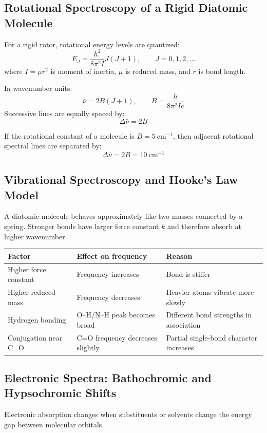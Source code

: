 \documentclass[12pt,a4paper]{article}
\begin{document}
\subsection{Rotational Spectroscopy of a Rigid Diatomic Molecule}
For a rigid rotor, rotational energy levels are quantized:
\[
E_J=\frac{h^2}{8\pi^2I}J(J+1),\qquad J=0,1,2,\ldots
\]
where $I=\mu r^2$ is moment of inertia, $\mu$ is reduced mass, and $r$ is bond length.

\begin{tcolorbox}[formulabox, title={Rotational Spectral Lines}]
In wavenumber units:
\[
\bar{\nu}=2B(J+1),\qquad B=\frac{h}{8\pi^2Ic}
\]
Successive lines are equally spaced by:
\[
\Delta\bar{\nu}=2B
\]
\end{tcolorbox}

\begin{tcolorbox}[examplebox, title={Solved Example: Rotational Line Spacing}]
If the rotational constant of a molecule is $B=5\ \mathrm{cm^{-1}}$, then adjacent rotational spectral lines are separated by:
\[
\Delta\bar{\nu}=2B=10\ \mathrm{cm^{-1}}
\]
\end{tcolorbox}

\subsection{Vibrational Spectroscopy and Hooke's Law Model}
A diatomic molecule behaves approximately like two masses connected by a spring. Stronger bonds have larger force constant $k$ and therefore absorb at higher wavenumber.

\begin{tabularx}{\linewidth}{|B{3.2cm}|Y|Y|}
\hline
\textbf{Factor} & \textbf{Effect on frequency} & \textbf{Reason} \\
\hline
Higher force constant & Frequency increases & Bond is stiffer \\
\hline
Higher reduced mass & Frequency decreases & Heavier atoms vibrate more slowly \\
\hline
Hydrogen bonding & O--H/N--H peak becomes broad & Different bond strengths in association \\
\hline
Conjugation near C=O & C=O frequency decreases slightly & Partial single-bond character increases \\
\hline
\end{tabularx}

\subsection{Electronic Spectra: Bathochromic and Hypsochromic Shifts}
Electronic absorption changes when substituents or solvents change the energy gap between molecular orbitals.
\end{document}
